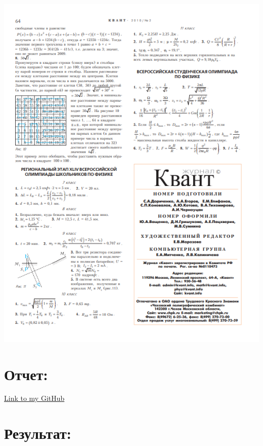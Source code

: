 \includegraphics[width=\linewidth]{task 1.png}\\
\section{Отчет:}
\href{https://github.com/PNT1319star/Informatics}{Link to my GitHub}
\section{Результат:}
\newpage